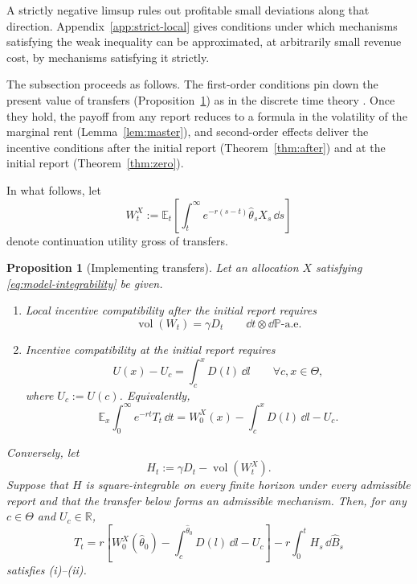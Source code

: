 \documentclass[12pt]{article}
\newtheorem{prop}{Proposition}
\DeclareMathOperator{\vol}{vol}
\newcommand{\E}{\mathbb{E}}
\newcommand{\hth}{\hat\theta}
\newcommand{\hB}{\hat B}
\begin{document}
 A strictly negative limsup rules out profitable small
deviations along that direction.
Appendix~\ref{app:strict-local} gives conditions under which mechanisms
satisfying the weak inequality can be approximated, at arbitrarily small
revenue cost, by mechanisms satisfying it strictly.

The subsection proceeds as follows. The first-order conditions
pin down the present value of transfers (Proposition~\ref{prop:transfers}) as in the discrete time theory \citep{pavan2014dynamic}. Once they
hold, the payoff from any report reduces to a formula in the
volatility of the marginal rent (Lemma~\ref{lem:master}), and
second-order effects deliver the incentive conditions after the
initial report (Theorem~\ref{thm:after}) and at the initial report
(Theorem~\ref{thm:zero}).

In what follows, let
\[
  W_t^X
  :=
  \E_t\left[
    \int_t^\infty e^{-r(s-t)}
      \hth_sX_s\,\dd s
  \right]
\]
denote continuation utility gross of transfers.

\begin{prop}[Implementing transfers]\label{prop:transfers}
Let an allocation \(X\) satisfying \eqref{eq:model-integrability} be
given.

\begin{enumerate}
  \item[\textnormal{(i)}]
  Local incentive compatibility after the initial report requires
  \begin{equation}\label{eq:transfer-volatility}
    \vol(W_t)=\gamma D_t
    \qquad
    \dd t\otimes\dd\mathbb P\text{-a.e.}
  \end{equation}

  \item[\textnormal{(ii)}]
  Incentive compatibility at the initial report requires
  \begin{equation}\label{eq:envelope}
    U(x)-U_c
    =
    \int_c^xD(l)\,\dd l
    \qquad
    \forall c,x\in\Theta,
  \end{equation}
  where \(U_c:=U(c)\). Equivalently,
  \begin{equation}\label{eq:expected-transfer}
    \E_x\int_0^\infty e^{-rt}T_t\,\dd t
    =
    W_0^X(x)-\int_c^xD(l)\,\dd l-U_c.
  \end{equation}
\end{enumerate}

Conversely, let
\[
  H_t:=\gamma D_t-\vol(W_t^X).
\]
Suppose that \(H\) is square-integrable on every finite horizon under
every admissible report and that the transfer below forms an
admissible mechanism.
Then, for any \(c\in\Theta\) and \(U_c\in\mathbb R\),
\[
  T_t
  =
  r\left[
    W_0^X(\hth_0)
    -\int_c^{\hth_0}D(l)\,\dd l-U_c
  \right]
  -r\int_0^tH_s\,\dd\hB_s
\]
satisfies \textnormal{(i)}--\textnormal{(ii)}.
\end{prop}
\end{document}
